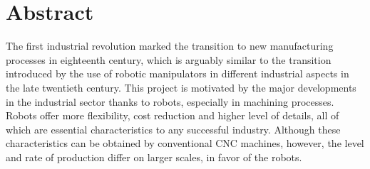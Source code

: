 \chapter*{Abstract}\label{ch:abstract}
%
%


The first industrial revolution marked the transition to new manufacturing processes in eighteenth century, which is arguably similar to the transition introduced by the use of robotic manipulators in different industrial aspects in the late twentieth century. This project is motivated by the major developments in the industrial sector thanks to robots, especially in machining processes. Robots offer more flexibility, cost reduction and higher level of details, all of which are essential characteristics to any successful industry. Although these characteristics can be obtained by conventional CNC machines, however, the level and rate of production differ on larger scales, in favor of the robots. 


